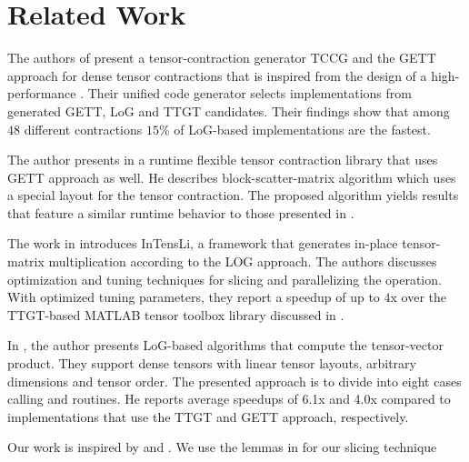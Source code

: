 \section{Related Work}
\label{sec:related}

\begin{comment}
The authors in \cite{dinapoli:2014:towards.efficient.use} discuss the efficient tensor contractions with highly optimized BLAS. 
Based on the LoG approach, they define requirements for the use of \tf{gemm} for class 3 tensor contractions and provide slicing techniques for tensors. %
The slicing recipe for the class 2 categorized tensor contractions contains a short description with a rule of thumb for maximizing performance.
Runtime measurements cover class 3 tensor contractions.
\end{comment}

The authors of \cite{springer:2018:design} present a tensor-contraction generator TCCG and the GETT approach for dense tensor contractions that is inspired from the design of a high-performance .
Their unified code generator selects implementations from generated GETT, LoG and TTGT candidates.
Their findings show that among $48$ different contractions $15$\% of LoG-based implementations are the fastest.

The author presents in \cite{matthews:2018:high} a runtime flexible tensor contraction library that uses GETT approach as well.
He describes block-scatter-matrix algorithm which uses a special layout for the tensor contraction.
The proposed algorithm yields results that feature a similar runtime behavior to those presented in \cite{springer:2018:design}.

The work in \cite{li:2015:input} introduces InTensLi, a framework that generates in-place tensor-matrix multiplication according to the LOG approach. 
The authors discusses optimization and tuning techniques for slicing and parallelizing the operation.
With optimized tuning parameters, they report a speedup of up to $4$x over the TTGT-based MATLAB tensor toolbox library discussed in \cite{bader:2006:algorithm862}.

In \cite{bassoy:2019:ttv}, the author presents LoG-based algorithms that compute the tensor-vector product. 
They support dense tensors with linear tensor layouts, arbitrary dimensions and tensor order.
The presented approach is to divide into eight cases calling  and  routines.
He reports average speedups of 6.1x and 4.0x compared to implementations that use the TTGT and GETT approach, respectively.

Our work is inspired by \cite{li:2015:input} and \cite{bassoy:2019:ttv}.
We use the lemmas in \cite{li:2015:input} for our slicing technique
